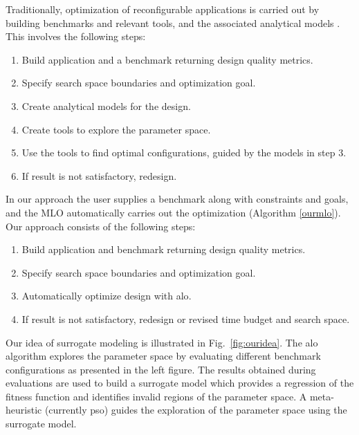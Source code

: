 \documentclass[runningheads,a4paper]{llncs}
\begin{document}
Traditionally, optimization of reconfigurable applications is carried out by building benchmarks and relevant tools, and the associated analytical models \cite{Anson2012Quad,Becker:2009:PDR:1530588.1530595}. This involves the following steps:


\begin{enumerate}\addtolength{\itemsep}{-0.1\baselineskip}  
\item Build application and a benchmark returning design quality metrics.
\item Specify search space boundaries and optimization goal.
\item Create analytical models for the design.
\item Create tools to explore the parameter space.
\item Use the tools to find optimal configurations, guided by the models in step 3.
\item If result is not satisfactory, redesign.
\end{enumerate}


In our approach the user supplies a benchmark along with constraints and goals, and the MLO automatically carries out the optimization (Algorithm \ref{ourmlo}). Our approach consists of the following steps:

\begin{enumerate}\addtolength{\itemsep}{-0.1\baselineskip}  
\item Build application and benchmark returning design quality metrics.
\item Specify search space boundaries and optimization goal.
\item Automatically optimize design with \ac{alo}.
\item If result is not satisfactory, redesign or revised time budget and search space.

\end{enumerate}

Our idea of surrogate modeling is illustrated in Fig.~\ref{fig:ouridea}. The \ac{alo} algorithm explores the parameter space by evaluating different benchmark configurations as presented in the left figure. The results obtained during evaluations are used to build a surrogate model which provides a regression of the fitness function and identifies invalid regions of the parameter space. A meta-heuristic (currently \ac{pso}) guides the exploration of the parameter space using the surrogate model. 
\end{document}
